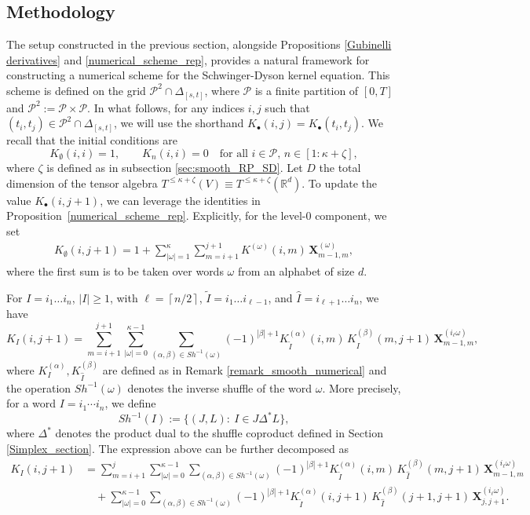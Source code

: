 \documentclass{article}%
\newcommand{\ceil}[1]{\left \lceil {#1}\right \rceil}
\begin{document}
\subsection{Methodology}
The setup constructed in the previous section, alongside Propositions \ref{Gubinelli derivatives} and \ref{numerical_scheme_rep}, provides a natural framework for constructing a numerical scheme for the Schwinger-Dyson kernel equation. This scheme is defined on the grid $\mathcal{P}^2 \cap \Delta_{[s,t]}$, where $\mathcal{P}$ is a finite partition of $[0,T]$ and $\mathcal{P}^2 := \mathcal{P} \times \mathcal{P}$. In what follows, for any indices \(i,j\) such that \((t_i,t_j)\in \mathcal{P}^2 \cap \Delta_{[s,t]}\), we will use the shorthand $K_\bullet(i,j) = K_\bullet(t_i, t_j)$. We recall that the initial conditions are
\[
K_{\emptyset}(i,i) = 1, \qquad K_n(i,i) = 0 \quad \text{for all } i \in \mathcal{P},\, n \in [1: \kappa +  \zeta],
\]
where $\zeta$ is defined as in subsection \ref{sec:smooth_RP_SD}. Let $D$ the total dimension of the tensor algebra $T^{\le \kappa + \zeta}(V) \equiv T^{\le \kappa + \zeta}(\mathbb{R}^d)$.\newline
To update the value $K_\bullet(i,j+1)$, we can leverage the identities in Proposition~\ref{numerical_scheme_rep}. Explicitly, for the level-$0$ component, we set
\begin{align} \label{trace_numerical}
K_\emptyset(i,j+1)
= 1 + \sum_{|\omega| = 1}^{\kappa} \sum_{m=i+1}^{j+1} 
K^{(\omega)}(i,m)\, \mathbf{X}^{(\omega)}_{m-1,m},
\end{align}
where the first sum is to be taken over words $\omega$ from an alphabet of size $d$. 

For $I = i_1 \dots i_n$, $|I| \geq 1$, with $\ell = \ceil{n/2}$, $\tilde{I} = i_1 \dots i_{\ell -1}$, and $\hat{I} = i_{\ell + 1} \dots i_{n}$, we have
\[
K_{I}(i,j+1)
= \sum_{m=i+1}^{j+1}
\sum_{|\omega| = 0}^{\kappa-1}
\sum_{(\alpha,\beta)\in Sh^{-1}(\omega)}
(-1)^{|\beta| + 1}
K^{(\alpha)}_{\tilde{I}}(i,m)\,
K^{(\beta)}_{\hat{I}}(m,j+1)\,
\mathbf{X}^{(i_\ell\omega)}_{m-1,m},
\]
where $K^{(\alpha)}_I, K^{(\beta)}_{\hat{I}}$ are defined as in Remark \ref{remark_smooth_numerical} and the operation \(Sh^{-1}(\omega)\) denotes the inverse shuffle of the word \(\omega\). More precisely, for a word \(I=i_1\cdots i_n\), we define
\[
Sh^{-1}(I)
:=
\{(J,L):\ I\in J \Delta^{*} L\},
\]
where \(\Delta^{*}\) denotes the product dual to the shuffle coproduct defined in Section \ref{Simplex_section}.\newline
The expression above can be further decomposed as
\begin{align}
K_{I}(i,j+1)
&= \sum_{m=i+1}^{j}
\sum_{|\omega| = 0}^{\kappa-1}
\sum_{(\alpha,\beta)\in Sh^{-1}(\omega)}
(-1)^{|\beta| + 1}
K^{(\alpha)}_{\tilde{I}}(i,m)\,
K^{(\beta)}_{\hat{I}}(m,j+1)\,
\mathbf{X}^{(i_\ell\omega)}_{m-1,m}
\label{term_b}\\
&\quad + \sum_{|\omega| = 0}^{\kappa-1}
\sum_{(\alpha,\beta)\in Sh^{-1}(\omega)}
(-1)^{|\beta| + 1}
K^{(\alpha)}_{\tilde{I}}(i,j+1)\,
K^{(\beta)}_{\hat{I}}(j+1,j+1)\,
\mathbf{X}^{(i_\ell\omega)}_{j,j+1}.
\label{term_A}
\end{align}
\end{document}
